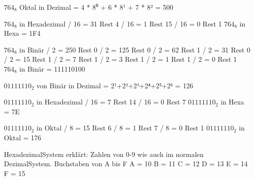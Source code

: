 \documentclass[a4paper,11pt,titlepage]{article}
\begin{document}
\pagebreak

$764_8$ Oktal in Dezimal \newline
= 4 * 8⁰ + 6 * 8¹ + 7 * 8² \newline
= 500\newline

$764_8$ in Hexadezimal  / 16 = 31 Rest 4  / 16 =  1 Rest 15  / 16 =  0 Rest 1 \newline
$764_8$ in Hexa = 1F4 \newline

$764_8$ in Bin\"ar  / 2 = 250 Rest 0  / 2 = 125 Rest 0  / 2 =  62 Rest 1  / 2 =  31 Rest 0  / 2 =  15 Rest 1  / 2 =   7 Rest 1  / 2 =   3 Rest 1  / 2 =   1 Rest 1  / 2 =   0 Rest 1 \newline
 $764_8$ in Bin\"ar = 111110100





$01111110_2$ von Bin\"ar in Dezimal \newline
= 2¹+2²+2³+2⁴+2⁵+2⁶ \newline
= 126 \newline

$01111110_2$ in Hexadezimal  / 16 = 7 Rest 14  / 16 = 0 Rest  7 \newline
$01111110_2$ in Hexa = 7E

$01111110_2$ in Oktal  / 8 = 15 Rest 6  / 8 =  1 Rest 7  / 8 =  0 Rest 1 \newline
$01111110_2$ in Oktal = 176


 

HexadezimalSystem erklärt: \newline
Zahlen von 0-9 wie auch im normalen DezimalSystem. \newline
Buchstaben von A bis F\newline
A = 10 \newline
B = 11 \newline
C = 12 \newline
D = 13 \newline
E = 14 \newline
F = 15 \newline
\end{document}
